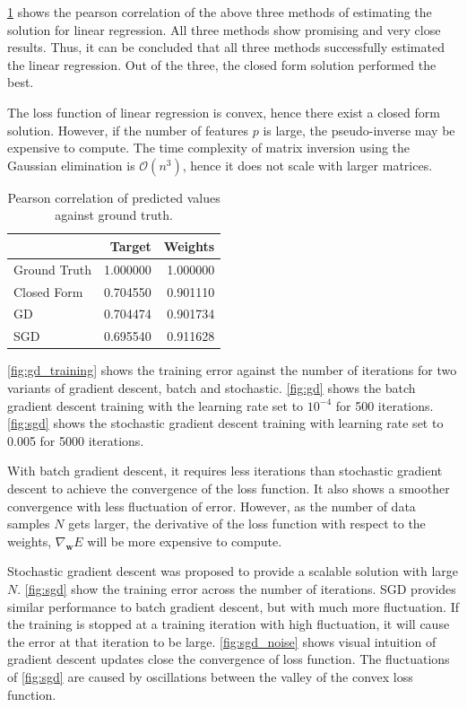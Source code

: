 \documentclass{article}
\begin{document}
\cref{tab:task1_corr} shows the pearson correlation of the above three methods of estimating the solution for linear regression. All three methods show promising and very close results. Thus, it can be concluded that all three methods successfully estimated the linear regression. Out of the three, the closed form solution performed the best.

The loss function of linear regression is convex, hence there exist a closed form solution. However, if the number of features $p$ is large, the pseudo-inverse may be expensive to compute. The time complexity of matrix inversion using the Gaussian elimination is $\mathcal{O}(n^3)$, hence it does not scale with larger matrices.

\begin{table}[h!]
    \centering
    \caption{Pearson correlation of predicted values against ground truth.}
    \label{tab:task1_corr}
    \begin{tabular}{lrr}
    \toprule
    {} &    Target &   Weights \\
    \midrule
    Ground Truth &  1.000000 &  1.000000 \\
    Closed Form  &  0.704550 &  0.901110 \\
    GD           &  0.704474 &  0.901734 \\
    SGD          &  0.695540 &  0.911628 \\
    \bottomrule
    \end{tabular}
\end{table}

\cref{fig:gd_training} shows the training error against the number of iterations for two variants of gradient descent, batch and stochastic. \cref{fig:gd} shows the batch gradient descent training with the learning rate set to $10^{-4}$ for 500 iterations. \cref{fig:sgd} shows the stochastic gradient descent training with learning rate set to 0.005 for 5000 iterations.

With batch gradient descent, it requires less iterations than stochastic gradient descent to achieve the convergence of the loss function. It also shows a smoother convergence with less fluctuation of error. However, as the number of data samples $N$ gets larger, the derivative of the loss function with respect to the weights, $\nabla_{\boldsymbol{w}} E$ will be more expensive to compute.

Stochastic gradient descent was proposed to provide a scalable solution with large $N$. \cref{fig:sgd} show the training error across the number of iterations. SGD provides similar performance to batch gradient descent, but with much more fluctuation. If the training is stopped at a training iteration with high fluctuation, it will cause the error at that iteration to be large. \cref{fig:sgd_noise} shows visual intuition of gradient descent updates close the convergence of loss function. The fluctuations of \cref{fig:sgd} are caused by oscillations between the valley of the convex loss function.
\end{document}
